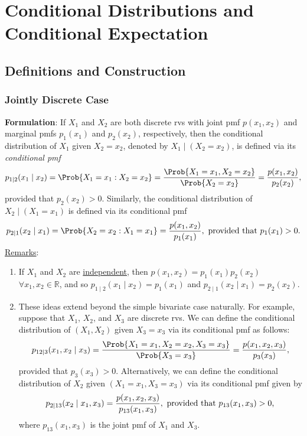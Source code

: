 \chapter{Conditional Distributions and Conditional Expectation}
\section{Definitions and Construction}
\subsection*{Jointly Discrete Case}
\begin{Regular}
    \textbf{Formulation}: If $ X_1 $ and $ X_2 $ are both discrete rvs with joint pmf $ p(x_1,x_2) $ and
    marginal pmfs $ p_1(x_1) $ and $ p_2(x_2) $, respectively, then the conditional distribution of $ X_1 $
    given $ X_2=x_2 $, denoted by $ X_1\mid (X_2=x_2) $, is defined via its \emph{conditional pmf}
    \[ p_{1\mid 2}(x_1\mid x_2)=\Prob{X_1=x_1\given X_2=x_2}=\frac{\Prob{X_1=x_1,X_2=x_2}}{\Prob{X_2=x_2}}=\frac{p(x_1,x_2)}{p_2(x_2)}, \]
    provided that $ p_2(x_2)>0 $. Similarly, the conditional distribution of $ X_2\mid(X_1=x_1) $ is defined via its conditional pmf
    \[ p_{2\mid 1}(x_2\mid x_1)=\Prob{X_2=x_2\given X_1=x_1}=\frac{p(x_1,x_2)}{p_1(x_1)},\text{ provided that $ p_1(x_1)>0 $.} \]
    \tcblower{}
    \underline{Remarks}:
    \begin{enumerate}[(1)]
        \item If $ X_1 $ and $ X_2 $ are \underline{independent}, then $ p(x_1,x_2)=p_1(x_1)p_2(x_2) $ $ \forall x_1,x_2\in\mathbb{R} $, and so
              $ p_{1\mid 2}(x_1\mid x_2)=p_1(x_1) $ and $ p_{2\mid 1}(x_2\mid x_1)=p_2(x_2) $.
        \item These ideas extend beyond the simple bivariate case naturally. For example,
              suppose that $ X_1 $, $ X_2 $, and $ X_3 $ are discrete rvs. We can define the conditional distribution
              of $ (X_1,X_2) $ given $ X_3=x_3 $ via its conditional pmf as follows:
              \[ p_{12\mid 3}(x_1,x_2\mid x_3)=\frac{\Prob{X_1=x_1,X_2=x_2,X_3=x_3}}{\Prob{X_3=x_3}}=\frac{p(x_1,x_2,x_3)}{p_3(x_3)}, \]
              provided that $ p_3(x_3)>0 $. Alternatively, we can define the conditional distribution of $ X_2 $
              given $ (X_1=x_1,X_3=x_3) $ via its conditional pmf given by
              \[ p_{2\mid 13}(x_2\mid x_1,x_3)=\frac{p(x_1,x_2,x_3)}{p_{13}(x_1,x_3)},\text{ provided that $ p_{13}(x_1,x_3)>0 $,} \]
              where $ p_{13}(x_1,x_3) $ is the joint pmf of $ X_1 $ and $ X_3 $.
    \end{enumerate}
\end{Regular}
